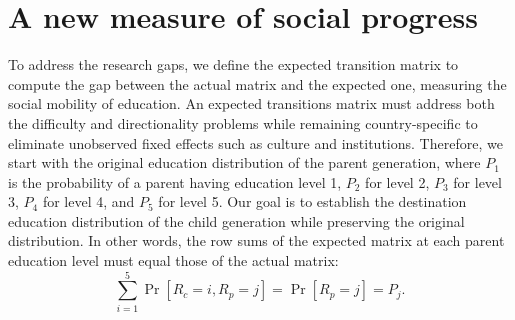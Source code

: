 \section{A new measure of social progress} \label{sec:new}

To address the research gaps, we define the expected transition matrix to compute the gap between the actual matrix and the expected one, measuring the social mobility of education. An expected transitions matrix must address both the difficulty and directionality problems while remaining country-specific to eliminate unobserved fixed effects such as culture and institutions. Therefore, we start with the original education distribution of the parent generation, where \( P_1 \) is the probability of a parent having education level 1, \( P_2 \) for level 2, \( P_3 \) for level 3, \( P_4 \) for level 4, and \( P_5 \) for level 5. Our goal is to establish the destination education distribution of the child generation while preserving the original distribution. In other words, the row sums of the expected matrix at each parent education level must equal those of the actual matrix:  
\begin{equation}
\sum_{i=1}^{5} \operatorname{Pr}[R_c = i, R_p = j] = \operatorname{Pr}[R_p = j] = P_j.
\label{eq:1}
\end{equation}

